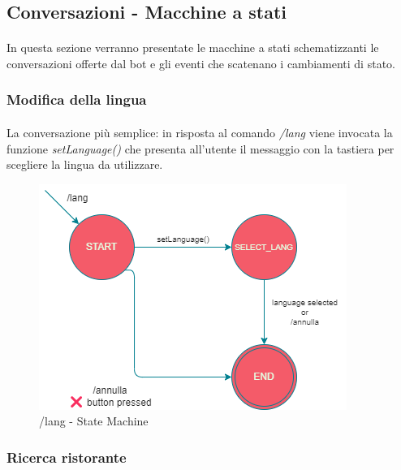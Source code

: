 \documentclass[a4paper, 12pt]{article}
\begin{document}
	\subsection{Conversazioni - Macchine a stati}
	\paragraph{}
	In questa sezione verranno presentate le macchine a stati schematizzanti le conversazioni offerte dal bot e gli eventi che scatenano i cambiamenti di stato.
	\subsubsection{Modifica della lingua}
	\paragraph{}
	La conversazione più semplice: in risposta al comando \textit{/lang} viene invocata la funzione \textit{setLanguage()} che presenta all'utente il messaggio con la tastiera per scegliere la lingua da utilizzare.\\
	\begin{figure}[h!]
		\centering
		\includegraphics[scale=0.7]{TasteIt_Lang_StateMachine.png}
		\caption{/lang - State Machine}
		\label{fig:LangStateMachine}
	\end{figure}
	
	\newpage
	\subsubsection{Ricerca ristorante}
\end{document}
